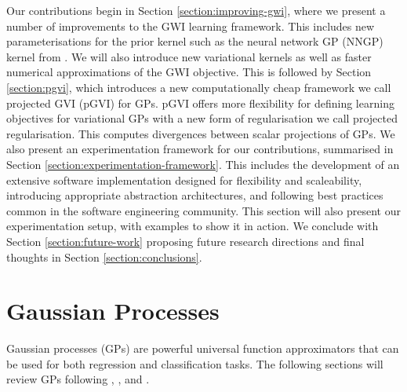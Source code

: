 \documentclass{article}
\numberwithin{equation}{section}
\begin{document}
Our contributions begin in Section \ref{section:improving-gwi}, where we present a number of improvements to the GWI learning framework.
This includes new parameterisations for the prior kernel such as the neural network GP (NNGP) kernel from \cite{novak2019neural}.
We will also introduce new variational kernels as well as faster numerical approximations of the GWI objective.
This is followed by Section \ref{section:pgvi}, which introduces a new computationally cheap framework we call projected GVI 
(pGVI) for GPs.
pGVI offers more flexibility for defining learning objectives for variational GPs with a new form of regularisation we call projected regularisation.
This computes divergences between scalar projections of GPs.
We also present an experimentation framework for our contributions, summarised in Section \ref{section:experimentation-framework}. 
This includes the development of an extensive software implementation designed for flexibility and scaleability, introducing appropriate abstraction architectures, and following best practices common in the software engineering community. 
This section will also present our experimentation setup, with examples to show it in action. We conclude with Section \ref{section:future-work} proposing future research directions and final thoughts in Section \ref{section:conclusions}.

\newpage
\section{Gaussian Processes}\label{section:gaussian-processes}
Gaussian processes (GPs) are powerful universal function approximators that can be used for both regression and classification tasks. The following sections will review GPs following \cite{rasmussen2003gaussian}, \cite{matthews2017scalable}, and \cite{wild2022generalized}.
\end{document}
